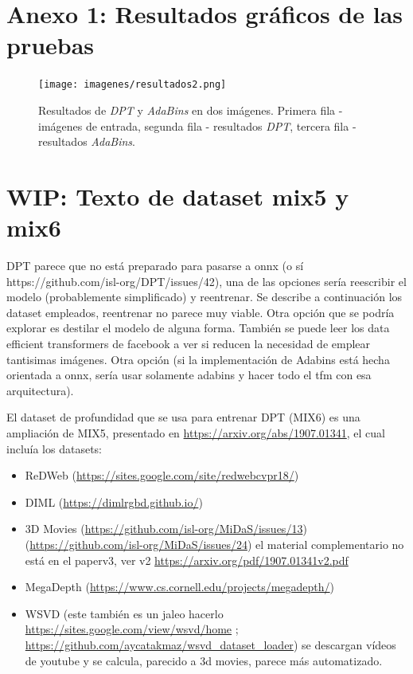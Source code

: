 \documentclass[a4paper]{article}
\begin{document}
\section{Anexo 1: Resultados gráficos de las pruebas}\label{anexo1}
\begin{figure}[H]
\centering
\texttt{[image: imagenes/resultados2.png]} 
\captionsetup{width=.8\linewidth}
\caption{Resultados de \textit{DPT} y \textit{AdaBins} en dos imágenes. Primera fila - imágenes de entrada, segunda fila - resultados \textit{DPT}, tercera fila - resultados \textit{AdaBins}.}
\label{fig:resultados-anexo2}
\end{figure}

\section{WIP: Texto de dataset mix5 y mix6}\label{unk}
DPT parece que no está preparado para pasarse a onnx (o sí https://github.com/isl-org/DPT/issues/42), una de las opciones sería reescribir el modelo (probablemente simplificado) y reentrenar. Se describe a continuación los dataset empleados, reentrenar no parece muy viable. Otra opción que se podría explorar es destilar el modelo de alguna forma. También se puede leer los data efficient transformers de facebook a ver si reducen la necesidad de emplear tantisimas imágenes. Otra opción (si la implementación de Adabins está hecha orientada a onnx, sería usar solamente adabins y hacer todo el tfm con esa arquitectura).

El dataset de profundidad que se usa para entrenar DPT (MIX6) es una ampliación de MIX5, presentado en \url{https://arxiv.org/abs/1907.01341}, el cual incluía los datasets:
\begin{itemize}
\item ReDWeb (\url{https://sites.google.com/site/redwebcvpr18/})
\item DIML (\url{https://dimlrgbd.github.io/})
\item 3D Movies (\url{https://github.com/isl-org/MiDaS/issues/13}) (\url{https://github.com/isl-org/MiDaS/issues/24}) el material complementario no está en el paperv3, ver v2 \url{https://arxiv.org/pdf/1907.01341v2.pdf}
\item MegaDepth (\url{https://www.cs.cornell.edu/projects/megadepth/})
\item WSVD (este también es un jaleo hacerlo \url{https://sites.google.com/view/wsvd/home} ; \url{https://github.com/aycatakmaz/wsvd_dataset_loader}) se descargan vídeos de youtube y se calcula, parecido a 3d movies, parece más automatizado.
\end{itemize}
\end{document}

